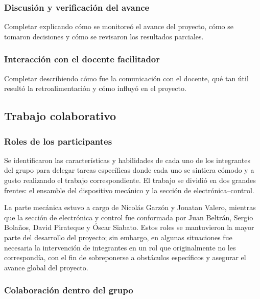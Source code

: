 \documentclass[11pt,a4paper]{article}
\begin{document}
\subsubsection*{Discusión y verificación del avance}
Completar explicando cómo se monitoreó el avance del proyecto, cómo se tomaron
decisiones y cómo se revisaron los resultados parciales.

\subsubsection*{Interacción con el docente facilitador}
Completar describiendo cómo fue la comunicación con el docente, qué tan útil
resultó la retroalimentación y cómo influyó en el proyecto.

\subsection{Trabajo colaborativo }
\label{subsec:trabajo_colaborativo}

\subsubsection*{Roles de los participantes}

Se identificaron las características y habilidades de cada uno de los integrantes del grupo para delegar
tareas específicas donde cada uno se sintiera cómodo y a gusto realizando el trabajo correspondiente.
El trabajo se dividió en dos grandes frentes: el ensamble del dispositivo mecánico y la sección de
electrónica–control.

La parte mecánica estuvo a cargo de Nicolás Garzón y Jonatan Valero, mientras que la sección de
electrónica y control fue conformada por Juan Beltrán, Sergio Bolaños, David Pirateque y Óscar Siabato.
Estos roles se mantuvieron la mayor parte del desarrollo del proyecto; sin embargo, en algunas
situaciones fue necesaria la intervención de integrantes en un rol que originalmente no les correspondía,
con el fin de sobreponerse a obstáculos específicos y asegurar el avance global del proyecto.

\subsubsection*{Colaboración dentro del grupo}
\end{document}
